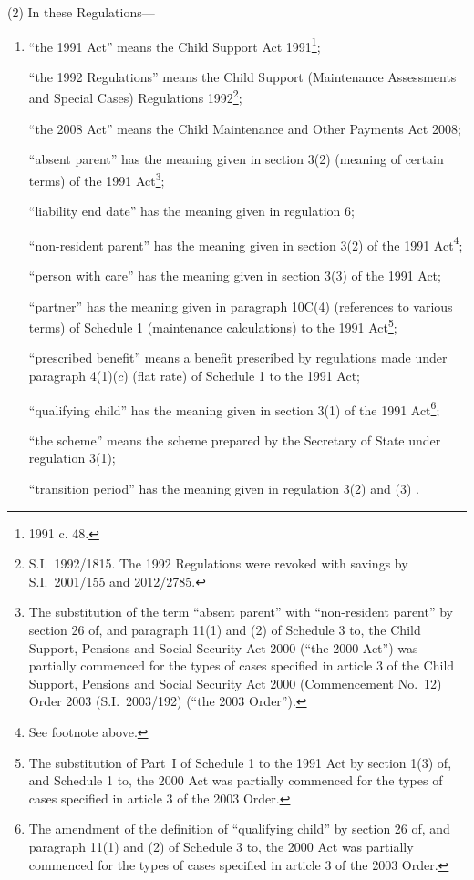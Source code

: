 \documentclass[12pt,a4paper]{article}
\begin{document}
(2) In these Regulations—
\begin{enumerate}\item[]
“the 1991 Act” means the Child Support Act 1991\footnote{1991 c. 48.};

“the 1992 Regulations” means the Child Support (Maintenance Assessments and Special Cases) Regulations 1992\footnote{S.I.~1992/1815. The 1992 Regulations were revoked with savings by S.I.~2001/155 and 2012/2785.};

“the 2008 Act” means the Child Maintenance and Other Payments Act 2008;

“absent parent” has the meaning given in section 3(2) (meaning of certain terms) of the 1991 Act\footnote{The substitution of the term “absent parent” with “non-resident parent” by section 26 of, and paragraph 11(1) and (2) of Schedule 3 to, the Child Support, Pensions and Social Security Act 2000 (“the 2000 Act”) was partially commenced for the types of cases specified in article 3 of the Child Support, Pensions and Social Security Act 2000 (Commencement No.~12) Order 2003 (S.I.~2003/192) (“the 2003 Order”).};

“liability end date” has the meaning given in regulation 6;

“non-resident parent” has the meaning given in section 3(2) of the 1991 Act\footnote{See footnote \ddag{} above.};

“person with care” has the meaning given in section 3(3) of the 1991 Act;

“partner” has the meaning given in paragraph 10C(4) (references to various terms) of Schedule 1 (maintenance calculations) to the 1991 Act\footnote{The substitution of Part~I of Schedule 1 to the 1991 Act by section 1(3) of, and Schedule 1 to, the 2000 Act was partially commenced for the types of cases specified in article 3 of the 2003 Order.};

“prescribed benefit” means a benefit prescribed by regulations made under paragraph 4(1)($c$)  (flat rate) of Schedule 1 to the 1991 Act;

“qualifying child” has the meaning given in section 3(1) of the 1991 Act\footnote{The amendment of the definition of “qualifying child” by section 26 of, and paragraph 11(1) and (2) of Schedule 3 to, the 2000 Act was partially commenced for the types of cases specified in article 3 of the 2003 Order.};

“the scheme” means the scheme prepared by the Secretary of State under regulation 3(1);

“transition period” has the meaning given in regulation 3(2)
and (3)%
.
\end{enumerate}
\end{document}
